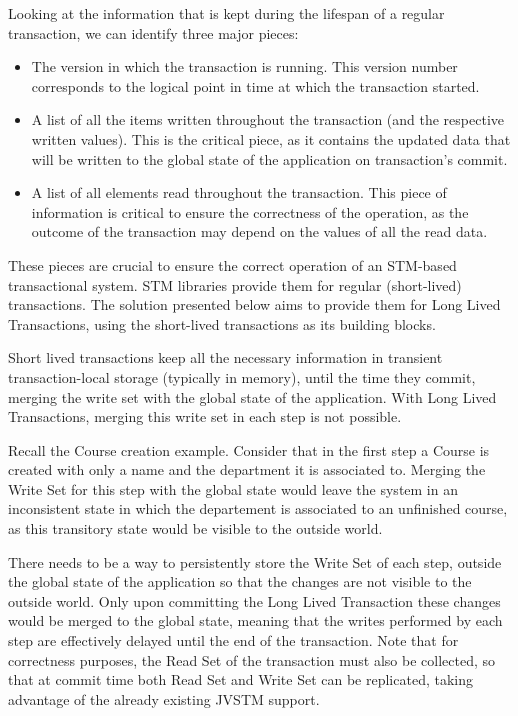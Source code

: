 \documentclass{llncs}
\begin{document}
Looking at the information that is kept during the lifespan of a
regular transaction, we can identify three major pieces:

\begin{itemize}
\item The version in which the transaction is running. This version
  number corresponds to the logical point in time at which the
  transaction started.
\item A list of all the items written throughout the transaction (and
  the respective written values). This is the critical piece, as it
  contains the updated data that will be written to the global state
  of the application on transaction's commit.
\item A list of all elements read throughout the transaction. This
  piece of information is critical to ensure the correctness of the
  operation, as the outcome of the transaction may depend on the
  values of all the read data.
\end{itemize}

These pieces are crucial to ensure the correct operation of an
STM-based transactional system. STM libraries provide them for regular
(short-lived) transactions. The solution presented below aims to
provide them for Long Lived Transactions, using the short-lived
transactions as its building blocks.

Short lived transactions keep all the necessary information in
transient transaction-local storage (typically in memory), until the
time they commit, merging the write set with the global state of the
application. With Long Lived Transactions, merging this write set in
each step is not possible.

Recall the Course creation example. Consider that in the first step a
Course is created with only a name and the department it is associated
to. Merging the Write Set for this step with the global state would
leave the system in an inconsistent state in which the departement is
associated to an unfinished course, as this transitory state would be
visible to the outside world.

There needs to be a way to persistently store the Write Set of each
step, outside the global state of the application so that the changes
are not visible to the outside world. Only upon committing the Long
Lived Transaction these changes would be merged to the global state,
meaning that the writes performed by each step are effectively delayed
until the end of the transaction. Note that for correctness purposes,
the Read Set of the transaction must also be collected, so that at
commit time both Read Set and Write Set can be replicated, taking
advantage of the already existing JVSTM support.
\end{document}
